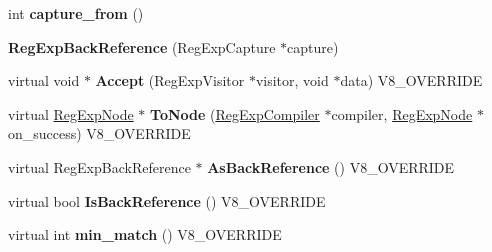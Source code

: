 \begin{DoxyCompactItemize}
\item 
\hypertarget{classv8_1_1internal_1_1_v8___f_i_n_a_l_aa37a916d15486779b3b81687f8470d8b}{}int {\bfseries capture\+\_\+from} ()\label{classv8_1_1internal_1_1_v8___f_i_n_a_l_aa37a916d15486779b3b81687f8470d8b}

\item 
\hypertarget{classv8_1_1internal_1_1_v8___f_i_n_a_l_afc74f931bb099124d5a98cc7df77e84b}{}{\bfseries Reg\+Exp\+Back\+Reference} (Reg\+Exp\+Capture $\ast$capture)\label{classv8_1_1internal_1_1_v8___f_i_n_a_l_afc74f931bb099124d5a98cc7df77e84b}

\item 
\hypertarget{classv8_1_1internal_1_1_v8___f_i_n_a_l_a5a421cb811caf33f244ce08fe3e5ac14}{}virtual void $\ast$ {\bfseries Accept} (Reg\+Exp\+Visitor $\ast$visitor, void $\ast$data) V8\+\_\+\+O\+V\+E\+R\+R\+I\+D\+E\label{classv8_1_1internal_1_1_v8___f_i_n_a_l_a5a421cb811caf33f244ce08fe3e5ac14}

\item 
\hypertarget{classv8_1_1internal_1_1_v8___f_i_n_a_l_aa183d4adede0c6af0c092eeebf59c194}{}virtual \hyperlink{classv8_1_1internal_1_1_reg_exp_node}{Reg\+Exp\+Node} $\ast$ {\bfseries To\+Node} (\hyperlink{classv8_1_1internal_1_1_reg_exp_compiler}{Reg\+Exp\+Compiler} $\ast$compiler, \hyperlink{classv8_1_1internal_1_1_reg_exp_node}{Reg\+Exp\+Node} $\ast$on\+\_\+success) V8\+\_\+\+O\+V\+E\+R\+R\+I\+D\+E\label{classv8_1_1internal_1_1_v8___f_i_n_a_l_aa183d4adede0c6af0c092eeebf59c194}

\item 
\hypertarget{classv8_1_1internal_1_1_v8___f_i_n_a_l_af4ee205b951c4489ed27a6f9ee7df786}{}virtual Reg\+Exp\+Back\+Reference $\ast$ {\bfseries As\+Back\+Reference} () V8\+\_\+\+O\+V\+E\+R\+R\+I\+D\+E\label{classv8_1_1internal_1_1_v8___f_i_n_a_l_af4ee205b951c4489ed27a6f9ee7df786}

\item 
\hypertarget{classv8_1_1internal_1_1_v8___f_i_n_a_l_aa96ed227fae1208f9ccd716cbe5e2297}{}virtual bool {\bfseries Is\+Back\+Reference} () V8\+\_\+\+O\+V\+E\+R\+R\+I\+D\+E\label{classv8_1_1internal_1_1_v8___f_i_n_a_l_aa96ed227fae1208f9ccd716cbe5e2297}

\item 
\hypertarget{classv8_1_1internal_1_1_v8___f_i_n_a_l_ac4abdb29d336dc24ef96695ac805b1ac}{}virtual int {\bfseries min\+\_\+match} () V8\+\_\+\+O\+V\+E\+R\+R\+I\+D\+E\label{classv8_1_1internal_1_1_v8___f_i_n_a_l_ac4abdb29d336dc24ef96695ac805b1ac}


\end{DoxyCompactItemize}
